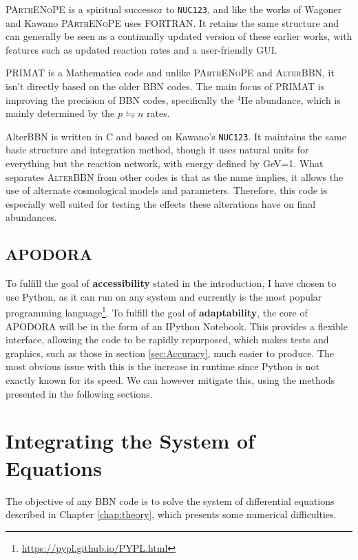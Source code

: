 \textsc{PArthENoPE}\cite{PArthENoPE} is a spiritual successor to \texttt{NUC123}, and like the works of Wagoner and Kawano \textsc{PArthENoPE} uses FORTRAN. It retains the same structure and can generally be seen as a continually updated version of these earlier works, with features such as updated reaction rates and a user-friendly GUI.

PRIMAT\cite{PRIMAT} is a Mathematica code and unlike \textsc{PArthENoPE} and \textsc{AlterBBN}, it isn't directly based on the older BBN codes. The main focus of PRIMAT is improving the precision of BBN codes, specifically the ${}^4$He abundance, which is mainly determined by the $p\leftrightharpoons n$ rates. 

AlterBBN\cite{AlterBBN} is written in C and based on Kawano's \texttt{NUC123}. It maintains the same basic structure and integration method, though it uses natural units for everything but the reaction network, with energy defined by GeV=1. What separates \textsc{AlterBBN} from other codes is that as the name implies, it allows the use of alternate cosmological models and parameters. Therefore, this code is especially well suited for testing the effects these alterations have on final abundances.

\subsection{APODORA}
To fulfill the goal of \textbf{accessibility} stated in the introduction, I have chosen to use Python, as it can run on any system and currently is the most popular programming language\footnote{\url{https://pypl.github.io/PYPL.html}}. To fulfill the goal of \textbf{adaptability}, the core of APODORA will be in the form of an IPython Notebook\cite{IPython:2007}. This provides a flexible interface, allowing the code to be rapidly repurposed, which makes tests and graphics, such as those in section \ref{sec:Accuracy}, much easier to produce. 
The most obvious issue with this is the increase in runtime since Python is not exactly known for its speed. We can however mitigate this, using the methods presented in the following sections.



\section{Integrating the System of Equations}
\label{sec:Solving}

The objective of any BBN code is to solve the system of differential equations described in Chapter \ref{chap:theory}, which presents some numerical difficulties. 

